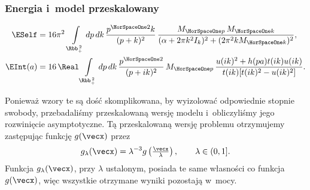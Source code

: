 \documentclass[10pt,t]{beamer}
\begin{document}
\begin{frame}
  \frametitle{Energia i~model przeskalowany}

  \vspace{-2em}


  \begin{subequations}

    \begin{align}
      \label{eq:Pole-skalarne-ETC-05-A}
      \ESelf
      &=
        16 \pi^{ 2 } \, \int\limits_{ \Rbb_{ + }^{ \, 2 } } dp \, dk \,
        \frac{ p^{ \HorSpaceOne 2 } k }{ ( p + k )^{ 2 } } \,
        \frac{ M_{ \HorSpaceOne p } \, M_{ \HorSpaceOne k } }{
        ( \alpha + 2 \pi k^{ 2 } I_{ k } )^{ 2 } +
        ( 2 \pi^{ 2 } k M_{ \HorSpaceOne k } )^{ 2 } }, \\
      \label{eq:Pole-skalarne-ETC-05-B}
      \EInt( a )
      &=
        16 \, \Real \int\limits_{ \Rbb_{ + }^{ \, 2 } } dp \, dk \,
        \frac{ p^{ \HorSpaceOne 2 } }{ ( p + i k )^{ 2 } } \,
        M_{ \HorSpaceOne p } \,
        \frac{ u( i k )^{ 2 } + h( p a ) t( i k ) u( i k ) }{
        t( i k ) [ t( i k )^{ 2 } - u( i k )^{ 2 } ] }.
    \end{align}

  \end{subequations}



  Ponieważ wzory te są dość skomplikowana, by wyizolować odpowiednie
  stopnie swobody, przebadaliśmy przeskalowaną wersję modelu i~obliczyliśmy
  jego rozwinięcie asymptotyczne. Tą przeskalowaną wersję problemu
  otrzymujemy zastępując funkcję $g( \vecx )$ przez
  \begin{equation}
    \label{eq:Pole-skalarne-ETC-06}
    g_{ \lambda }( \vecx ) =
    \lambda^{ -3 } g\left( \tfrac{ \vecx }{ \lambda } \right), \qquad
    \lambda \in ( 0, 1 ].
  \end{equation}
  Funkcja $g_{ \lambda }( \vecx )$, przy $\lambda$ ustalonym, posiada te same
  własności co funkcja $g( \vecx )$, więc wszystkie otrzymane wyniki
  pozostają w~mocy.

\end{frame}
\end{document}
